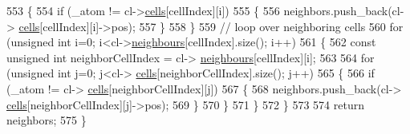 \begin{DoxyCode}
553                                 \{
554                                                 \textcolor{keywordflow}{if} (\_atom != cl->\hyperlink{classcell_list_a10bc0c3ae819293b1e88bc7d1bfdb2aa}{cells}[cellIndex][i])
555                                                 \{
556                                                                 neighbors.push\_back(cl->
      \hyperlink{classcell_list_a10bc0c3ae819293b1e88bc7d1bfdb2aa}{cells}[cellIndex][i]->pos);
557                                                 \}
558                                 \}
559                                 \textcolor{comment}{// loop over neighboring cells}
560                                 \textcolor{keywordflow}{for} (\textcolor{keywordtype}{unsigned} \textcolor{keywordtype}{int} i=0; i<cl->\hyperlink{classcell_list_ada607886d0e5a20d710dde694d6d989f}{neighbours}[cellIndex].size(); i++)
561                                 \{
562                                                 \textcolor{keyword}{const} \textcolor{keywordtype}{unsigned} \textcolor{keywordtype}{int} neighborCellIndex = cl->
      \hyperlink{classcell_list_ada607886d0e5a20d710dde694d6d989f}{neighbours}[cellIndex][i];
563                                                 
564                                                 \textcolor{keywordflow}{for} (\textcolor{keywordtype}{unsigned} \textcolor{keywordtype}{int} j=0; j<cl->
      \hyperlink{classcell_list_a10bc0c3ae819293b1e88bc7d1bfdb2aa}{cells}[neighborCellIndex].size(); j++)
565                                                 \{
566                                                                 \textcolor{keywordflow}{if} (\_atom != cl->
      \hyperlink{classcell_list_a10bc0c3ae819293b1e88bc7d1bfdb2aa}{cells}[neighborCellIndex][j])
567                                                                 \{
568                                                                                 neighbors.push\_back(cl->
      \hyperlink{classcell_list_a10bc0c3ae819293b1e88bc7d1bfdb2aa}{cells}[neighborCellIndex][j]->pos);
569                                                                 \}
570                                                 \}
571                                 \}
572                 \}
573                 
574                 \textcolor{keywordflow}{return} neighbors;
575 \}
\end{DoxyCode}
\hypertarget{classsim_system_aa31d40c91cb50f143a9613d362798887}{}
